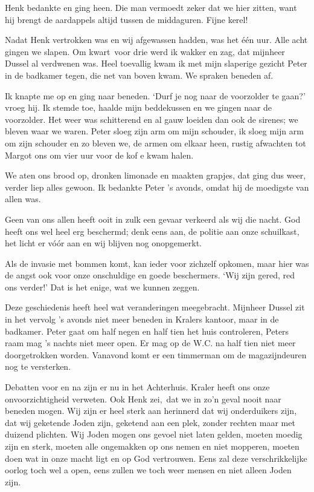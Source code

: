 \documentclass{book}
\begin{document}
Henk bedankte en ging heen. Die man vermoedt zeker dat we hier zitten,
want hij brengt de aardappels altijd tussen de middaguren. Fijne kerel!

Nadat Henk vertrokken was en wij afgewassen hadden, was het één uur.
Alle acht gingen we slapen. Om kwart~voor drie werd ik wakker en zag,
dat mijnheer Dussel al verdwenen was. Heel toevallig kwam ik met mijn
slaperige gezicht Peter in de badkamer tegen, die net van boven kwam. We
spraken beneden af.

Ik knapte me op en ging naar beneden. `Durf je nog naar de voorzolder te
gaan?' vroeg hij. Ik stemde toe, haalde mijn beddekussen en we gingen
naar de voorzolder. Het weer was schitterend en al gauw loeiden dan ook
de sirenes; we bleven waar we waren. Peter sloeg zijn arm om mijn
schouder, ik sloeg mijn arm om zijn schouder en zo bleven we, de armen
om elkaar heen, rustig afwachten tot Margot ons om vier uur voor de kof
e kwam halen.

We aten ons brood op, dronken limonade en maakten grapjes, dat ging dus
weer, verder liep alles gewoon. Ik bedankte Peter 's avonds, omdat hij
de moedigste van allen was.

Geen van ons allen heeft ooit in zulk een gevaar verkeerd als wij die
nacht. God heeft ons wel heel erg beschermd; denk eens aan, de politie
aan onze schuilkast, het licht er vóór aan en wij blijven nog
onopgemerkt.

Als de invasie met bommen komt, kan ieder voor zichzelf opkomen, maar
hier was de angst ook voor onze onschuldige en goede beschermers. `Wij
zijn gered, red ons verder!' Dat is het enige, wat we kunnen zeggen.

Deze geschiedenis heeft heel wat veranderingen meegebracht. Mijnheer
Dussel zit in het vervolg 's avonds niet meer beneden in Kralers
kantoor, maar in de badkamer. Peter gaat om half negen en half tien het
huis controleren, Peters raam mag 's nachts niet meer open. Er mag op de
W.C. na half tien niet meer doorgetrokken worden. Vanavond komt er een
timmerman om de magazijndeuren nog te versterken.

Debatten voor en na zijn er nu in het Achterhuis. Kraler heeft ons onze
onvoorzichtigheid verweten. Ook Henk zei,~dat we in zo'n geval nooit
naar beneden mogen. Wij zijn er heel sterk aan herinnerd dat wij
onderduikers zijn, dat wij geketende Joden zijn, geketend aan een plek,
zonder rechten maar met duizend plichten. Wij Joden mogen ons gevoel
niet laten gelden, moeten moedig zijn en sterk, moeten alle ongemakken
op ons nemen en niet mopperen, moeten doen wat in onze macht ligt en op
God vertrouwen. Eens zal deze verschrikkelijke oorlog toch wel a open,
eens zullen we toch weer mensen en niet alleen Joden zijn.
\end{document}
